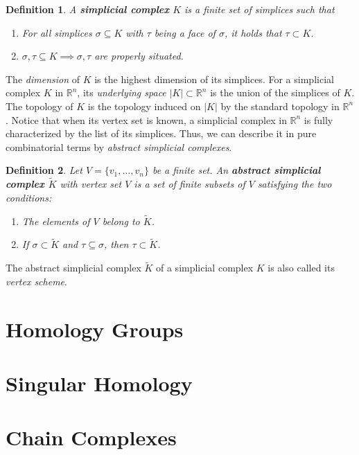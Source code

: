 \documentclass{article}
\newtheorem*{definition}{Definition}
\begin{document}
\begin{definition}
A \textbf{simplicial complex} $K$ is a finite set of simplices such that
\begin{enumerate}
	\item For all simplices $\sigma \subseteq K$ with $\tau$ being a face of $\sigma$, it holds that $\tau \subset K$.
	\item $\sigma, \tau \subseteq K \implies \sigma, \tau$ are properly situated.
\end{enumerate}
\end{definition}

The \emph{dimension} of $K$ is the highest dimension of its simplices. For a simplicial complex $K$ in $\mathbb{R}^n$, its \emph{underlying space} $\vert K \vert \subset \mathbb{R}^n$ is the union of the simplices of $K$. The topology of $K$ is the topology induced on $\vert K \vert$ by the standard topology in $\mathbb{R}^n$. Notice that when its vertex set is known, a simplicial complex in $\mathbb{R}^n$ is fully characterized by the list of its simplices. Thus, we can describe it in pure combinatorial terms by \emph{abstract simplicial complexes}.

\begin{definition}
Let $V = \{v_1, \ldots, v_n\}$ be a finite set. An \textbf{abstract simplicial complex $\tilde{K}$} with vertex set $V$ is a set of finite subsets of $V$ satisfying the two conditions:
\begin{enumerate}
	\item The elements of $V$ belong to $\tilde{K}$.
	\item If $\sigma \subset \tilde{K}$ and $\tau \subseteq \sigma$, then $\tau \subset \tilde{K}$.
\end{enumerate}
\end{definition}

The abstract simplicial complex $\tilde{K}$ of a simplicial complex $K$ is also called its \emph{vertex scheme}. 

\section{Homology Groups}
\section{Singular Homology}
\section{Chain Complexes}
\end{document}
